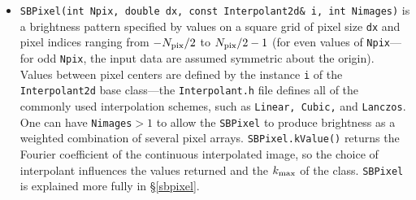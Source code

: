 \documentclass[11pt,preprint,flushrt]{aastex}
\begin{document}
\begin{itemize}
\item {\tt SBPixel(int Npix, double dx, const Interpolant2d\& i, int Nimages)} is a brightness pattern specified by values on a square grid of pixel size {\tt dx} and pixel indices ranging from $-N_{\rm pix}/2$ to $N_{\rm pix}/2-1$ (for even values of {\tt Npix}---for odd {\tt Npix}, the input data are assumed symmetric about the origin).  Values between pixel centers are defined by the instance {\tt i} of the {\tt Interpolant2d} base class---the {\tt Interpolant.h} file defines all of the commonly used interpolation schemes, such as {\tt Linear, Cubic,} and {\tt Lanczos}.  One can have {\tt Nimages}$>1$ to allow the {\tt SBPixel} to produce brightness as a weighted combination of several pixel arrays.  {\tt SBPixel.kValue()} returns the Fourier coefficient of the continuous interpolated image, so the choice of interpolant influences the values returned and the $k_{\rm max}$ of the class.  {\tt SBPixel} is explained more fully in \S\ref{sbpixel}.
\end{itemize}
\end{document}
